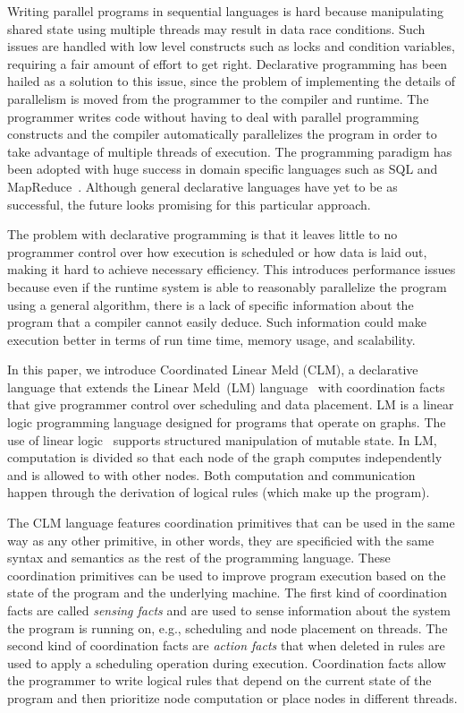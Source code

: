 Writing parallel programs in sequential languages is hard because manipulating
shared state using multiple threads may result in data race
conditions. Such issues are handled with low level constructs such as locks and
condition variables, requiring a fair amount of effort to get right.
Declarative programming has been hailed as a solution to this issue, since the
problem of implementing the details of parallelism is moved from the programmer to the
compiler and runtime. The programmer writes code
without having to deal with parallel programming constructs and the compiler
automatically parallelizes the program in order to take advantage of
multiple threads of execution.
The programming paradigm has been adopted with huge success in domain specific
languages such as SQL and MapReduce~\cite{Dean:2008:MSD:1327452.1327492}.
Although general declarative languages have yet to be as successful, the
future looks promising for this particular approach.

The problem with declarative programming is that it leaves little to no programmer control
over how execution is scheduled or how data is laid out, making it hard to achieve
necessary efficiency. This introduces 
performance issues because even if the runtime system is able to reasonably
parallelize the program using a general algorithm, there is a lack of specific
information about the program that a compiler cannot easily deduce. Such
information could make execution better in terms of run time time,
memory usage, and scalability.

In this paper, we introduce Coordinated Linear Meld (CLM), a declarative
language that extends the Linear Meld~(LM) language~\cite{cruz-iclp14,cruz-ppdp14} with coordination facts that give programmer
control over scheduling and data placement. LM is a linear logic programming
language designed for programs that operate on graphs.  The use of linear
logic~\cite{girard-87} supports structured manipulation of mutable
state. In LM, computation is divided so that each node of the graph computes
independently and is allowed to  with other nodes.
Both computation and communication happen through the derivation of logical
rules (which make up the program).

The CLM language features coordination
primitives that can be used in the same way as any other primitive,
in other words, they are specificied with the same syntax and semantics as the
rest of the programming language. These coordination primitives can be used to
improve program execution based on the state of the program and the underlying
machine. The first kind of coordination facts are called \emph{sensing facts}
and are used to sense information about the system the program is running on,
e.g., scheduling and node placement on threads. The second kind of coordination facts are
\emph{action facts} that when deleted in rules are used to apply a scheduling
operation during execution. Coordination facts allow the programmer to write
logical rules that depend on the current state of the program and then prioritize node
computation or place nodes in different threads.

